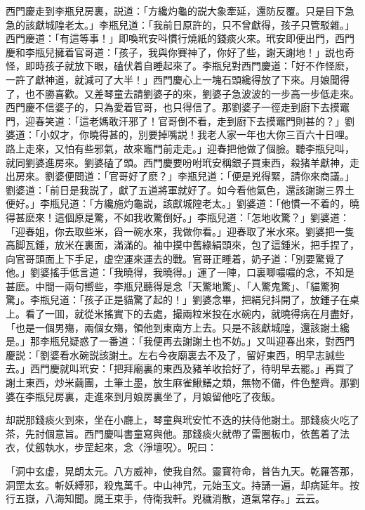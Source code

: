 西門慶走到李瓶兒房裏，説道：「方纔灼龜的説大象牽延，還防反覆。只是目下急急的該獻城隍老太。」李瓶兒道：「我前日原許的，只不曾獻得，孩子只管駁雜。」西門慶道：「有這等事！」即喚玳安呌慣行燒紙的錢痰火來。玳安即便出門，西門慶和李瓶兒擁着官哥道：「孩子，我與你賽神了，你好了些，謝天謝地！」説也奇怪，即時孩子就放下眼，磕伏着自睡起來了。李瓶兒對西門慶道：「好不作怪麽，一許了獻神道，就減可了大半！」西門慶心上一塊石頭纔得放了下來。月娘聞得了，也不勝喜歡。又差琴童去請劉婆子的來，劉婆子急波波的一步高一步低走來。西門慶不信婆子的，只為愛着官哥，也只得信了。那劉婆子一徑走到廚下去摸竈門，迎春笑道：「這老媽敢汗邪了！官哥倒不看，走到廚下去摸竈門則甚的？」劉婆道：「小奴才，你曉得甚的，別要掉嘴説！我老人家一年也大你三百六十日哩。路上走來，又怕有些邪氣，故來竈門前走走。」迎春把他做了個臉。聽李瓶兒叫，就同劉婆進房來。劉婆磕了頭。西門慶要吩咐玳安稱銀子買東西，殺猪羊獻神，走出房來。劉婆便問道：「官哥好了麽？」李瓶兒道：「便是兇得緊，請你來商議。」劉婆道：「前日是我説了，獻了五道將軍就好了。如今看他氣色，還該謝謝三界土便好。」李瓶兒道：「方纔施灼龜説，該獻城隍老太。」劉婆道：「他慣一不着的，曉得甚麽來！這個原是驚，不如我收驚倒好。」李瓶兒道：「怎地收驚？」劉婆道：「迎春姐，你去取些米，舀一碗水來，我做你看。」迎春取了米水來。劉婆把一隻高脚瓦鍾，放米在裏面，滿滿的。袖中摸中舊綠絹頭來，包了這鍾米，把手捏了，向官哥頭面上下手足，虚空運來運去的戰。官哥正睡着，奶子道：「別要驚覺了他。」劉婆搖手低言道：「我曉得，我曉得。」運了一陣，口裏唧噥噥的念，不知是甚麽。中間一兩句嚮些，李瓶兒聽得是念「天驚地驚」、「人驚鬼驚」、「貓驚狗驚」。李瓶兒道：「孩子正是貓驚了起的！」劉婆念畢，把絹兒抖開了，放鍾子在桌上。看了一囬，就從米搖實下的去處，撮兩粒米投在水碗内，就曉得病在月盡好，「也是一個男殤，兩個女殤，領他到東南方上去。只是不該獻城隍，還該謝土纔是。」那李瓶兒疑惑了一番道：「我便再去謝謝土也不妨。」又叫迎春出來，對西門慶説：「劉婆看水碗説該謝土。左右今夜廟裏去不及了，留好東西，明早志誠些去。」西門慶就叫玳安：「把拜廟裏的東西及豬羊收拾好了，待明早去罷。」再買了謝土東西，炒米繭團，土筆土墨，放生麻雀鰍鱔之類，無物不備，件色整齊。那劉婆在李瓶兒房裏，走進來到月娘房裏坐了，月娘留他吃了夜飯。

却説那錢痰火到來，坐在小廳上，琴童與玳安忙不迭的扶侍他謝土。那錢痰火吃了茶，先討個意旨。西門慶叫書童寫與他。那錢痰火就帶了雷圈板巾，依舊着了法衣，仗劔執水，步罡起來，念〈淨壇呪〉。呪曰：

「洞中玄虚，晃朗太元。八方威神，使我自然。靈寳符命，普告九天。乾羅答那，洞罡太玄。斬妖縛邪，殺鬼萬千。中山神咒，元始玉文。持誦一遍，却病延年。按行五嶽，八海知聞。魔王束手，侍衛我軒。兇穢消散，道氣常存。」云云。

